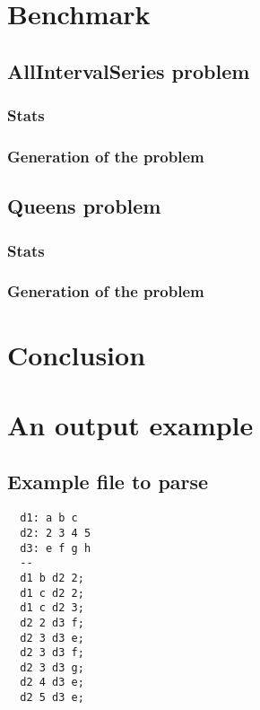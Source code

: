 \documentclass{rapport}
\begin{document}
\section{Benchmark}

\subsection{AllIntervalSeries problem}
\subsubsection{Stats}


\subsubsection{Generation of the problem}
\label{sec:allIntGen}

\newpage

\subsection{Queens problem}
\subsubsection{Stats}



\subsubsection{Generation of the problem}



\section{Conclusion}
\newpage

\appendix

\section{An output example}

\subsection{Example file to parse}
\label{sec:input_ex}
\begin{verbatim}
  d1: a b c 
  d2: 2 3 4 5
  d3: e f g h
  --
  d1 b d2 2;
  d1 c d2 2;
  d1 c d2 3;
  d2 2 d3 f;
  d2 3 d3 e;
  d2 3 d3 f;
  d2 3 d3 g;
  d2 4 d3 e;
  d2 5 d3 e;
\end{verbatim}
\end{document}
